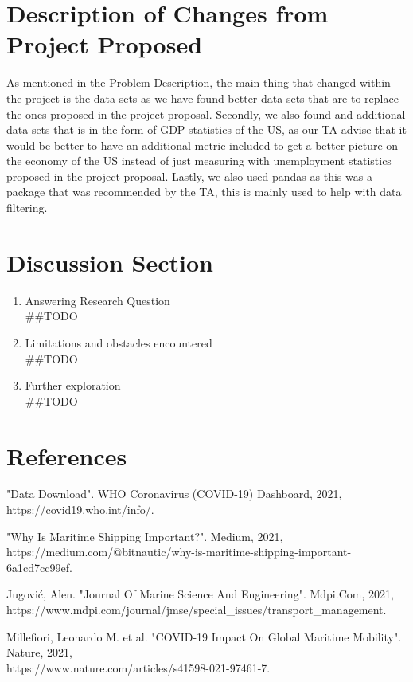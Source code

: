\documentclass[fontsize=11pt]{article}
\begin{document}
\section*{Description of Changes from Project Proposed}
As mentioned in the Problem Description, the main thing that changed within the project is the data sets as we have found better data sets that are to replace the ones proposed in the project proposal. Secondly, we also found and additional data sets that is in the form of GDP statistics of the US, as our TA advise that it would be better to have an additional metric included to get a better picture on the economy of the US instead of just measuring with unemployment statistics proposed in the project proposal. Lastly, we also used pandas as this was a package that was recommended by the TA, this is mainly used to help with data filtering.

\section*{Discussion Section}
\begin{enumerate}
    \item Answering Research Question\\
    ##TODO
    \item Limitations and obstacles encountered\\
    ##TODO
    \item Further exploration\\
    ##TODO
\end{enumerate}

\section*{References}

\hspace*{4mm} "Data Download". WHO Coronavirus (COVID-19) Dashboard, 2021, https://covid19.who.int/info/.

"Why Is Maritime Shipping Important?". Medium, 2021,\\ https://medium.com/@bitnautic/why-is-maritime-shipping-important-6a1cd7cc99ef.

Jugović, Alen. "Journal Of Marine Science And Engineering". Mdpi.Com, 2021,\\ https://www.mdpi.com/journal/jmse/special\_issues/transport\_management.

Millefiori, Leonardo M. et al. "COVID-19 Impact On Global Maritime Mobility". Nature, 2021,\\ https://www.nature.com/articles/s41598-021-97461-7.
\end{document}

